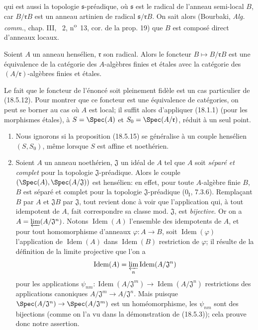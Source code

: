 
qui est aussi la topologie $\mathfrak s$-préadique, où $\mathfrak s$ est le radical de l'anneau semi-local $B$, car $B/\mathfrak rB$ est un anneau artinien de radical $\mathfrak s/\mathfrak rB$. On sait alors (Bourbaki, \emph{Alg. comm.}, chap. III, \textsection~2, n\textsuperscript{o}~13, cor. de la prop. 19) que $B$ est composé direct d'anneaux locaux.

\begin{proposition}[18.5.15]
\label{IV.18.5.15}
Soient $A$ un anneau hensélien, $\mathfrak r$ son radical. Alors le foncteur $B\longmapsto B/\mathfrak rB$ est une équivalence de la catégorie des $A$-algèbres finies et étales avec la catégorie des $(A/\mathfrak r)$-algèbres finies et étales.
\end{proposition}

Le fait que le foncteur de l'énoncé soit pleinement fidèle est un cas particulier de (18.5.12). Pour montrer que ce foncteur est une équivalence de catégories, on peut se borner au cas où $A$ est local; il suffit alors d'appliquer (18.1.1) (pour les morphismes étales), à $S=\Spec(A)$ et $S_0=\Spec(A/\mathfrak r)$, réduit à un seul point.

\begin{remarks}[18.5.16]
\label{IV.18.5.16}
\begin{enumerate}
  \item[(i)] Nous ignorons si la proposition (18.5.15) se généralise à un couple hensélien $(S,S_0)$, même lorsque $S$ est affine et noethérien.
  \item[(ii)] Soient $A$ un anneau noethérien, $\mathfrak J$ un idéal de $A$ tel que $A$ soit \emph{séparé et complet} pour la topologie $\mathfrak J$-préadique. Alors le couple $(\Spec(A),\Spec(A/\mathfrak J))$ est hensélien: en effet, pour toute $A$-algèbre finie $B$, $B$ est séparé et complet pour la topologie $\mathfrak J$-préadique ($0_{\mathrm I}$, 7.3.6). Remplaçant $B$ par $A$ et $\mathfrak J B$ par $\mathfrak J$, tout revient donc à voir que l'application qui, à tout idempotent de $A$, fait correspondre sa classe mod. $\mathfrak J$, est \emph{bijective}. Or on a $A=\varprojlim (A/\mathfrak J^n)$. Notons $\operatorname{Idem}(A)$ l'ensemble des idempotents de $A$, et pour tout homomorphisme d'anneaux $\varphi:A\to B$, soit $\operatorname{Idem}(\varphi)$ l'application de $\operatorname{Idem}(A)$ dans $\operatorname{Idem}(B)$ restriction de $\varphi$; il résulte de la définition de la limite projective que l'on a
  \[
    \operatorname{Idem}(A)=\varprojlim_n\operatorname{Idem}(A/\mathfrak J^n)
  \]
  pour les applications $\psi_{nm}:\operatorname{Idem}(A/\mathfrak J^m)\to\operatorname{Idem}(A/\mathfrak J^n)$ restrictions des applications canoniques $A/\mathfrak J^m\to A/\mathfrak J^n$. Mais puisque $\Spec(A/\mathfrak J^n)\to\Spec(A/\mathfrak J^m)$ est un homéomorphisme, les $\psi_{nm}$ sont des bijections (comme on l'a vu dans la démonstration de (18.5.3)); cela prouve donc notre assertion.
\end{enumerate}
\end{remarks}

